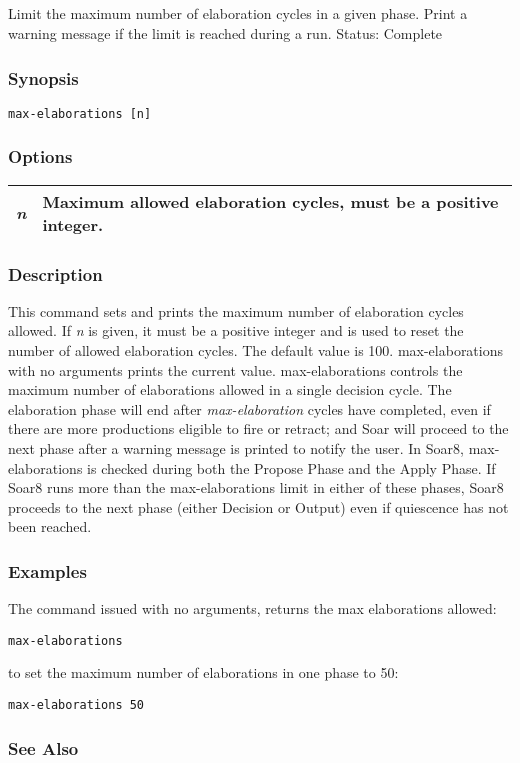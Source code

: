 \subsection{}
\label{max-elaborations}
Limit the maximum number of elaboration cycles in a given phase. Print a warning message if the limit is reached during a run. 
 Status: Complete
\subsubsection*{Synopsis}
\begin{verbatim}
max-elaborations [n]
\end{verbatim}
\subsubsection*{Options}
\begin{tabular}{|l|l|}
\hline 
\emph{n}
 & Maximum allowed elaboration cycles, must be a positive integer.  \\
 \hline 
\end{tabular}
\subsubsection*{Description}
 This command sets and prints the maximum number of elaboration cycles allowed. If \emph{n}
 is given, it must be a positive integer and is used to reset the number of allowed elaboration cycles. The default value is 100. max-elaborations with no arguments prints the current value. 
 max-elaborations controls the maximum number of elaborations allowed in a single decision cycle. The elaboration phase will end after \emph{max-elaboration}
 cycles have completed, even if there are more productions eligible to fire or retract; and Soar will proceed to the next phase after a warning message is printed to notify the user. 
 In Soar8, max-elaborations is checked during both the Propose Phase and the Apply Phase. If Soar8 runs more than the max-elaborations limit in either of these phases, Soar8 proceeds to the next phase (either Decision or Output) even if quiescence has not been reached. 
\subsubsection*{Examples}
 The command issued with no arguments, returns the max elaborations allowed: \begin{verbatim}
max-elaborations 
\end{verbatim}
 to set the maximum number of elaborations in one phase to 50: \begin{verbatim}
max-elaborations 50
\end{verbatim}
\subsubsection*{See Also}
